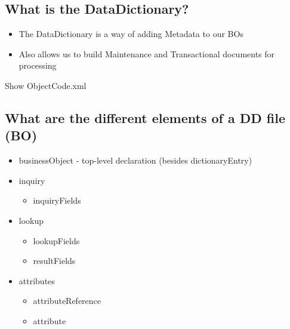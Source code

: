 \begin{ifhtml}
    \begin{s5slide}
        \section{What is the DataDictionary?}
            \begin{itemize}
                \item The DataDictionary is a way of adding Metadata to our BOs
                \item Also allows us to build Maintenance and Transactional documents for processing
            \end{itemize}
            \begin{s5notes}
                Show ObjectCode.xml
            \end{s5notes}
    \end{s5slide}
    \begin{s5slide}
        \section{What are the different elements of a DD file (BO)}
            \begin{itemize}
                \item businessObject - top-level declaration (besides dictionaryEntry)
                \item inquiry
                    \begin{itemize}
                        \item inquiryFields
                    \end{itemize}
                \item lookup
                    \begin{itemize}
                        \item lookupFields
                        \item resultFields
                    \end{itemize}
                \item attributes
                    \begin{itemize}
                        \item attributeReference
                        \item attribute
                    \end{itemize}
            \end{itemize}
    \end{s5slide}
    \begin{s5slide}

\end{s5slide}
\end{ifhtml}
